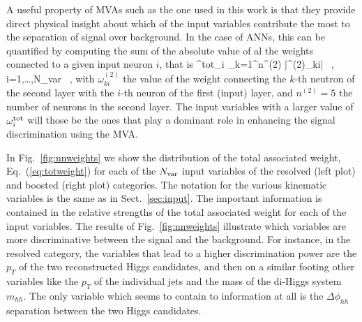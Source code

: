 A useful property of MVAs such as the one used in this work
is that they provide direct  physical insight about which of the
input variables contribute the most to the separation of
signal over background.
%
In the case of ANNs, this can be quantified by computing the sum
of the absolute value of al the weights connected to a given
input neuron $i$, that is
\be
\label{eq:totweight}
\omega^{\rm tot}_i \equiv \sum_{k=1}^{n^{(2)}} \Big|\omega^{(2)}_{ki}\Big| \, ,
\qquad i=1,\ldots,N_{\rm var} \, ,
\ee
with $\omega^{(2)}_{ki}$ the value of the weight connecting
the $k$-th neutron of the second layer with the $i$-th neuron of
the first (input) layer, and $n^{(2)}=5$ the number of
neurons in the second layer.
%
The input variables with a larger value of $\omega^{\rm tot}_i$ will those
be the ones that play a dominant role in enhancing the signal
discrimination using the MVA.

%
In Fig.~\ref{fig:nnweights} we show
the distribution of the total associated weight,
Eq.~(\ref{eq:totweight}) for each of the $N_{\rm var}$ input
variables of the resolved (left plot) and boosted (right plot) categories.
%
The notation for the various kinematic variables is the same
as in Sect.~\ref{sec:input}.
%
The important information
is contained in the relative strengths of the total associated weight
for each of the input variables.
%
The results of Fig.~\ref{fig:nnweights} illustrate which variables
are more discriminative between the signal and the background.
%
For instance, in the 
resolved category, the variables that lead to
a higher discrimination power
are the $p_T$ of the two reconstructed Higgs candidates, and then on a similar
footing other variables like the $p_T$ of the individual jets
and the mass of the di-Higgs system $m_{hh}$.
%
The only variable which seems to contain to information at all
is the $\Delta \phi_{hh}$ separation between the two
Higgs candidates.


